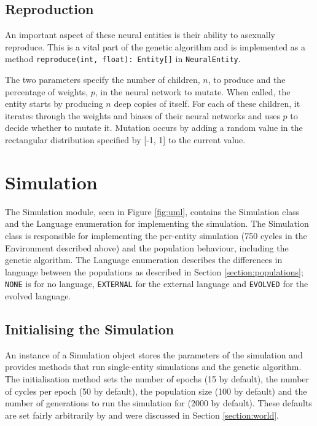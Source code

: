 \documentclass[12pt,a4paper]{report}
\begin{document}
\subsection{Reproduction}

An important aspect of these neural entities is their ability to asexually reproduce. This is a vital part of the genetic algorithm and is implemented as a method \texttt{reproduce(int, float): Entity[]} in \texttt{NeuralEntity}.

The two parameters specify the number of children, $n$, to produce and the percentage of weights, $p$, in the neural network to mutate. When called, the entity starts by producing $n$ deep copies of itself. For each of these children, it iterates through the weights and biases of their neural networks and uses $p$ to decide whether to mutate it. Mutation occurs by adding a random value in the rectangular distribution specified by [-1, 1] to the current value.

\section{Simulation}\label{section:simulation}

The Simulation module, seen in Figure \ref{fig:uml}, contains the Simulation class and the Language enumeration for implementing the simulation. The Simulation class is responsible for implementing the per-entity simulation (750 cycles in the Environment described above) and the population behaviour, including the genetic algorithm. The Language enumeration describes the differences in language between the populations as described in Section \ref{section:populations}; \texttt{NONE} is for no language, \texttt{EXTERNAL} for the external language and \texttt{EVOLVED} for the evolved language.

\subsection{Initialising the Simulation}\label{section:simulation-initialise}

An instance of a Simulation object stores the parameters of the simulation and provides methods that run single-entity simulations and the genetic algorithm. The initialisation method sets the number of epochs (15 by default), the number of cycles per epoch (50 by default), the population size (100 by default) and the number of generations to run the simulation for (2000 by default). These defaults are set fairly arbitrarily by \citet{Cangelosi1998} and were discussed in Section \ref{section:world}.
\end{document}

